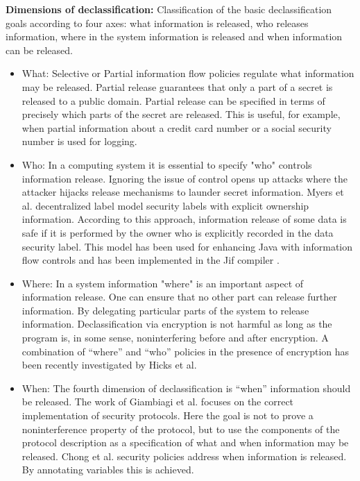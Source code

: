 \textbf{Dimensions of declassification:}
Classification of the basic declassification goals according to four axes: what information is released, who releases information, where in the system information is released and when information can be released.
\begin{itemize}
   \item What: Selective or Partial information flow policies \cite{ref_67_cohen1977information,ref_6_cohen1978information,ref_8_giacobazzi2005adjoining,ref_7_joshi2000semantic} regulate what
   information may be released. Partial release guarantees that only a part of a secret is
   released to a public domain. Partial release can be specified in terms of precisely which
   parts of the secret are released. This is useful,
   for example, when partial information about a credit card number or a social security number is used for logging.
   
   \item Who: In a computing system it is essential to specify "who" controls information release.
   Ignoring the issue of control opens up attacks where the attacker hijacks release
   mechanisms to launder secret information. Myers et al. decentralized label
   model \cite{ref_9_myers1997decentralized} security labels with explicit ownership information. According to this approach, information release of some data is safe if it is performed by the
   owner who is explicitly recorded in the data security label. This model has been used for enhancing Java with information flow controls \cite{ref_10_myers1999jflow} and has been implemented in
   the Jif compiler \cite{ref_11_myers2001jif}.
   
   \item Where: In a system information  "where" is an important aspect of information release. One can ensure that no other part can release further information. By delegating particular parts of the system to release information. Declassification
   via encryption is not harmful as long as the program is, in some sense, noninterfering
   before and after encryption.  A combination of \enquote{where} and \enquote{who} policies in the presence of encryption has
   been recently investigated by Hicks et al. \cite{ref_12_hicks2005declassification}
   
   \item When: The fourth dimension of declassification is  \enquote{when} information should be released. The work of Giambiagi et al. \cite{ref_19_giambiagi2003secure} focuses on the correct implementation of security protocols. Here the goal is not to prove a noninterference property of the protocol, but to use the components of the protocol description as a specification of what and when information may be released. Chong et al. security policies \cite{ref_13_chong2004security} address when information is released. By annotating variables this is achieved.
   
\end{itemize}

